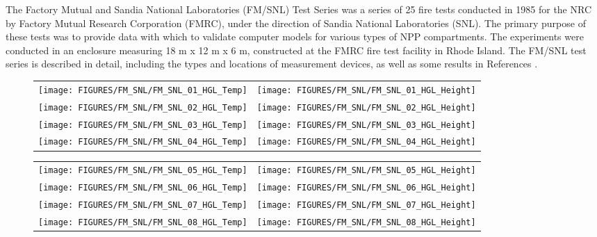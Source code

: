 The Factory Mutual and Sandia National Laboratories (FM/SNL) Test Series was a series of 25 fire tests conducted in 1985 for the NRC by Factory Mutual Research Corporation (FMRC), under the direction of Sandia National Laboratories (SNL).  The primary purpose of these tests was to provide data with which to validate computer models for various types of NPP compartments.  The experiments were conducted in an enclosure measuring 18 m x 12 m x 6 m, constructed at the FMRC fire test facility in Rhode Island.  The FM/SNL test series is described in detail, including the types and locations of measurement devices, as well as some results in References \cite{Nowlen:1987, Sandia:1989}.

\begin{figure}[p]
\begin{tabular*}{\textwidth}{l@{\extracolsep{\fill}}r}
\texttt{[image: FIGURES/FM\_SNL/FM\_SNL\_01\_HGL\_Temp]} &
\texttt{[image: FIGURES/FM\_SNL/FM\_SNL\_01\_HGL\_Height]} \\
\texttt{[image: FIGURES/FM\_SNL/FM\_SNL\_02\_HGL\_Temp]} &
\texttt{[image: FIGURES/FM\_SNL/FM\_SNL\_02\_HGL\_Height]} \\
\texttt{[image: FIGURES/FM\_SNL/FM\_SNL\_03\_HGL\_Temp]} &
\texttt{[image: FIGURES/FM\_SNL/FM\_SNL\_03\_HGL\_Height]} \\
\texttt{[image: FIGURES/FM\_SNL/FM\_SNL\_04\_HGL\_Temp]} &
\texttt{[image: FIGURES/FM\_SNL/FM\_SNL\_04\_HGL\_Height]}
\end{tabular*}
\end{figure}

\begin{figure}[p]
\begin{tabular*}{\textwidth}{l@{\extracolsep{\fill}}r}
\texttt{[image: FIGURES/FM\_SNL/FM\_SNL\_05\_HGL\_Temp]} &
\texttt{[image: FIGURES/FM\_SNL/FM\_SNL\_05\_HGL\_Height]} \\\texttt{[image: FIGURES/FM\_SNL/FM\_SNL\_06\_HGL\_Temp]} &
\texttt{[image: FIGURES/FM\_SNL/FM\_SNL\_06\_HGL\_Height]} \\
\texttt{[image: FIGURES/FM\_SNL/FM\_SNL\_07\_HGL\_Temp]} &
\texttt{[image: FIGURES/FM\_SNL/FM\_SNL\_07\_HGL\_Height]} \\
\texttt{[image: FIGURES/FM\_SNL/FM\_SNL\_08\_HGL\_Temp]} &
\texttt{[image: FIGURES/FM\_SNL/FM\_SNL\_08\_HGL\_Height]}
\end{tabular*}
\end{figure}


